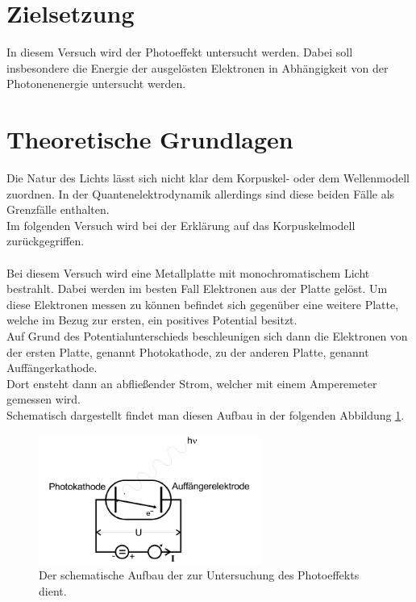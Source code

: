 \section{Zielsetzung}
    \noindent In diesem Versuch wird der Photoeffekt untersucht werden. 
    Dabei soll insbesondere die Energie der ausgelösten Elektronen in Abhängigkeit von der Photonenenergie untersucht werden.\\



\section{Theoretische Grundlagen}


    \noindent  Die Natur des Lichts lässt sich nicht klar dem Korpuskel- oder dem Wellenmodell zuordnen. 
    In der Quantenelektrodynamik allerdings sind diese beiden Fälle als Grenzfälle enthalten.\\
    Im folgenden Versuch wird bei der Erklärung auf das Korpuskelmodell zurückgegriffen.\\\\
    \noindent Bei diesem Versuch wird eine Metallplatte mit monochromatischem Licht bestrahlt. Dabei werden im besten Fall Elektronen aus der Platte gelöst.
    Um diese Elektronen messen zu können befindet sich gegenüber eine weitere Platte, welche im Bezug zur ersten, ein positives Potential besitzt.\\
    Auf Grund des Potentialunterschieds beschleunigen sich dann die Elektronen von der ersten Platte, genannt Photokathode, zu der anderen Platte, genannt Auffängerkathode.\\
    Dort ensteht dann an abfließender Strom, welcher mit einem Amperemeter gemessen wird.\\
    \noindent Schematisch dargestellt findet man diesen Aufbau in der folgenden Abbildung \ref{img:schem}. 

    \begin{figure}[H]
        \centering
        \includegraphics[width=0.65\textwidth]{latex/images/Schaltkreis.PNG}
        \caption{Der schematische Aufbau der zur Untersuchung des Photoeffekts dient\protect \cite{500}.}
        \label{img:schem}
    \end{figure}


